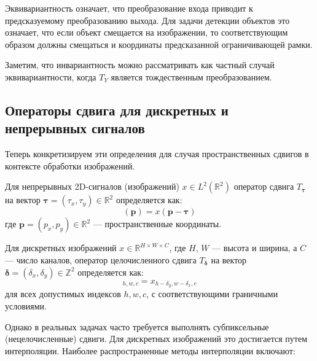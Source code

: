 Эквивариантность означает, что преобразование входа приводит к предсказуемому преобразованию выхода. Для задачи детекции объектов это означает, что если объект смещается на изображении, то соответствующим образом должны смещаться и координаты предсказанной ограничивающей рамки.

Заметим, что инвариантность можно рассматривать как частный случай эквивариантности, когда $T_Y$ является тождественным преобразованием.

\subsection{Операторы сдвига для дискретных и непрерывных сигналов}
\label{theory:formal_definition:shift_operators}

Теперь конкретизируем эти определения для случая пространственных сдвигов в контексте обработки изображений.

Для непрерывных 2D-сигналов (изображений) $x \in L^2(\mathbb{R}^2)$ оператор сдвига $T_{\boldsymbol{\tau}}$ на вектор $\boldsymbol{\tau} = (\tau_x, \tau_y) \in \mathbb{R}^2$ определяется как:
\begin{equation}
[T_{\boldsymbol{\tau}}x](\mathbf{p}) = x(\mathbf{p} - \boldsymbol{\tau})
\end{equation}
где $\mathbf{p} = (p_x, p_y) \in \mathbb{R}^2$ — пространственные координаты.

Для дискретных изображений $x \in \mathbb{R}^{H \times W \times C}$, где $H$, $W$ — высота и ширина, а $C$ — число каналов, оператор целочисленного сдвига $T_{\boldsymbol{\delta}}$ на вектор $\boldsymbol{\delta} = (\delta_x, \delta_y) \in \mathbb{Z}^2$ определяется как:
\begin{equation}
[T_{\boldsymbol{\delta}}x]_{h,w,c} = x_{h-\delta_y, w-\delta_x, c}
\end{equation}
для всех допустимых индексов $h, w, c$, с соответствующими граничными условиями.

Однако в реальных задачах часто требуется выполнять субпиксельные (нецелочисленные) сдвиги. Для дискретных изображений это достигается путем интерполяции. Наиболее распространенные методы интерполяции включают:

